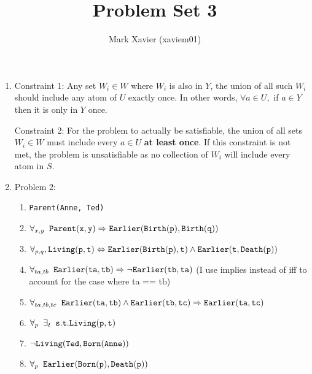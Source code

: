 \documentclass{article}
\title{Problem Set 3}
\author{Mark Xavier (xaviem01)}
\begin{document}
	\maketitle
	
	\begin{enumerate}
		
		\item Constraint 1: Any set $W_i \in W$ where $W_i$ is also in $Y$, the union of all such $W_i$ should include any atom of $U$ exactly once.  In other words, $\forall a \in U,$ if $a \in Y$ then it is only in $Y$ once.
		
		Constraint 2: For the problem to actually be satisfiable, the union of all sets $W_i \in W$ must include every $a \in U$ \textbf{at least once}.  If this constraint is not met, the problem is unsatisfiable as no collection of $W_i$ will include every atom in $S$.
		
		\item Problem 2:
			
			\begin{enumerate}
				
				\item {\tt Parent(Anne, Ted)}
				
				\item $\forall_{x, y} \phantom{a} {\tt Parent(x, y) \Rightarrow Earlier(Birth(p), Birth(q))}$
				
				\item $\forall_{p,q}, {\tt Living(p, t) \Leftrightarrow Earlier(Birth(p), t) \wedge Earlier(t, Death(p))}$
				
				\item $\forall_{ta, tb} \phantom{a} {\tt Earlier(ta,tb) \Rightarrow \neg Earlier(tb,ta)}$ (I use implies instead of iff to account for the case where ta == tb)
				
				\item $\forall_{ta,tb,tc} \phantom{a} {\tt Earlier(ta,tb) \wedge Earlier(tb, tc) \Rightarrow Earlier(ta, tc)}$
				
				\item $\forall_p \phantom{a} \exists_t \phantom{a} {\tt s.t. Living(p,t)}$
				
				\item ${\tt \neg Living(Ted, Born(Anne))}$
				
				\item $\forall_p \phantom{a} {\tt Earlier(Born(p), Death(p))}$
				 

\end{enumerate}
\end{enumerate}
\end{document}
